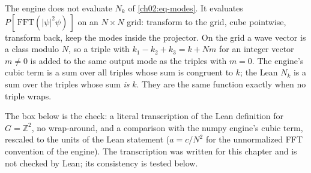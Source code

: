 The engine does not evaluate $N_k$ of \cref{ch02:eq-modes}. It evaluates $P[\,\mathrm{FFT}(|\psi|^2\psi)\,]$ on an $N\times N$ grid: transform to the grid, cube pointwise, transform back, keep the modes inside the projector. On the grid a
wave vector is a class modulo $N$, so a triple with $k_1-k_2+k_3=k+Nm$ for an integer vector $m\ne0$ is added to the same output mode as the triples with $m=0$. The engine's cubic term is a sum over all triples whose sum is congruent to $k$; the
Lean $N_k$ is a sum over the triples whose sum \emph{is} $k$. They are the same function exactly when no triple wraps.

The box below is the check: a literal transcription of the Lean definition for $G=\mathbb Z^2$, no wrap-around, and a comparison with the numpy engine's cubic term, rescaled to the units of the Lean statement ($a=c/N^2$ for the unnormalized FFT
convention of the engine). The transcription was written for this chapter and is not checked by Lean; its consistency is tested below.

